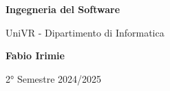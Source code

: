 \begin{titlepage}
	\begin{center}
		\vspace*{1cm}

		\Huge
    \textbf{Ingegneria del Software}

		\vspace{0.5cm}
		\LARGE
		UniVR - Dipartimento di Informatica

		\vspace{1.5cm}

		\textbf{Fabio Irimie}

		\vfill


		\vspace{0.8cm}


		2° Semestre 2024/2025

	\end{center}
\end{titlepage}
